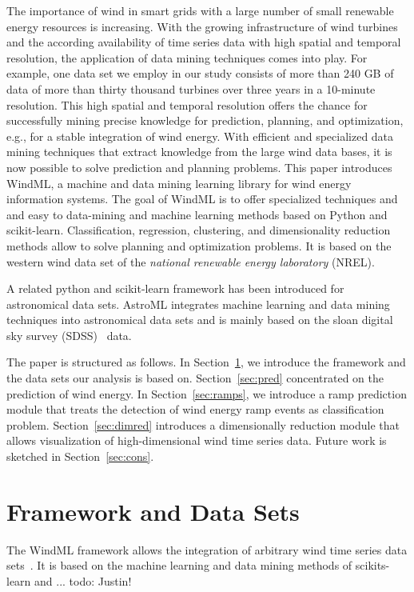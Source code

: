\documentclass[10pt, conference, compsocconf]{IEEEtran}
\begin{document}
The importance of wind in smart grids with a large number of small renewable energy resources is increasing. With the growing infrastructure of wind turbines and the according availability of time series data with high spatial and temporal resolution, the application of data mining techniques comes into play. For example, one data set we employ in our study consists of more than 240 GB of data of more than thirty thousand turbines over three years in a 10-minute resolution. This high spatial and temporal resolution offers the chance for successfully mining precise knowledge for prediction, planning, and optimization, e.g., for a stable integration of wind energy. With efficient and specialized data mining techniques that extract knowledge from the large wind data bases, it is now possible to solve prediction and planning problems. This paper introduces WindML, a machine and data mining learning library for wind energy information systems. The goal of WindML is to offer specialized techniques and and easy to data-mining and machine learning methods based on Python and scikit-learn. Classification, regression, clustering, and dimensionality reduction methods allow to solve planning and optimization problems. It is based on the western wind data set of the \textit{national renewable energy laboratory} (NREL). 

A related python and scikit-learn framework has been introduced for astronomical data sets. AstroML integrates machine learning and data mining techniques into astronomical data sets and is mainly based on the sloan digital sky survey (SDSS)~\cite{sdss} data.


The paper is structured as follows. In Section~\ref{sec:data}, we introduce the framework and the data sets our analysis is based on. Section~\ref{sec:pred} concentrated on the prediction of wind energy. In Section~\ref{sec:ramps}, we introduce a ramp prediction module that treats the detection of wind energy ramp events as classification problem. Section~\ref{sec:dimred} introduces a dimensionally reduction module that allows visualization of high-dimensional wind time series data. Future work is sketched in Section~\ref{sec:cons}.



\section{Framework and Data Sets}
\label{sec:data}

The WindML framework allows the integration of arbitrary wind time series data sets~\cite{astroML}. It is based on the machine learning and data mining methods of scikits-learn and ...
todo: Justin!
\end{document}

